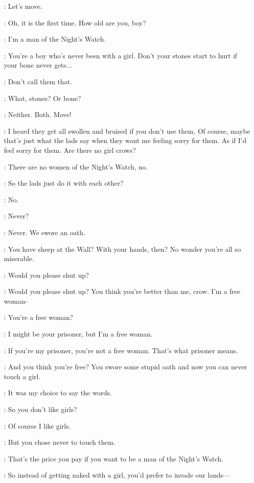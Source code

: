 \JON: Let's move.

\YGRITTE: Oh, it is the first time. How old are you, boy?

\JON: I'm a man of the Night's Watch.

\YGRITTE: You're a boy who's never been with a girl. Don't your stones start to hurt if your bone never gets$\ldots$

\JON: Don't call them that.

\YGRITTE: What, stones? Or bone?

\JON: Neither. Both. Move!


\YGRITTE: I heard they get all swollen and bruised if you don't use them. Of course, maybe that's just what the lads say when they want me feeling sorry for them. As if I'd feel sorry for them. Are there no girl crows?

\JON: There are no women of the Night's Watch, no.

\YGRITTE: So the lads just do it with each other?

\JON: No.

\YGRITTE: Never?

\JON: Never. We swore an oath.

\YGRITTE: You have sheep at the Wall?  With your hands, then?  No wonder you're all so miserable.

\JON: Would you please shut up?

\YGRITTE:  Would you please shut up? You think you're better than me, crow. I'm a free woman-

\JON: You're a free woman?

\YGRITTE: I might be your prisoner, but I'm a free woman.

\JON: If you're my prisoner, you're not a free woman. That's what prisoner means.

\YGRITTE: And you think you're free? You swore some stupid oath and now you can never touch a girl.

\JON: It was my choice to say the words.

\YGRITTE: So you don't like girls?

\JON: Of course I like girls.

\YGRITTE: But you chose never to touch them.

\JON: That's the price you pay if you want to be a man of the Night's Watch.

\YGRITTE: So instead of getting naked with a girl, you'd prefer to invade our lands---

